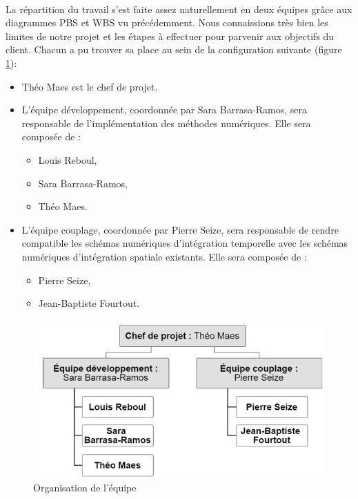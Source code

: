         \paragraph{}
        La répartition du travail s'est faite assez naturellement en deux équipes grâce aux diagrammes PBS et WBS vu précédemment. Nous connaissions très bien les limites de notre projet et les étapes à effectuer pour parvenir aux objectifs du client. Chacun a pu trouver sa place au sein de la configuration suivante (figure \ref{fig:OBS}):
        \begin{itemize}
            \item Théo Maes est le chef de projet.
            \item L'équipe développement, coordonnée par Sara Barrasa-Ramos, sera responsable de l'implémentation des méthodes numériques. Elle sera composée de :
            \begin{itemize}
                \item Louis Reboul,
                \item Sara Barrasa-Ramos,
                \item Théo Maes.
            \end{itemize}
            \item L'équipe couplage, coordonnée par Pierre Seize, sera responsable de rendre compatible les schémas numériques d'intégration temporelle avec les schémas numériques d'intégration spatiale existants. Elle sera composée de :
            \begin{itemize}
                \item Pierre Seize,
                \item Jean-Baptiste Fourtout.
            \end{itemize}
        \end{itemize}
        \begin{figure}
            \centering
            \includegraphics[scale=0.7]{images/obs.png}
            \caption{Organisation de l'équipe} 
            \label{fig:OBS}
        \end{figure}

